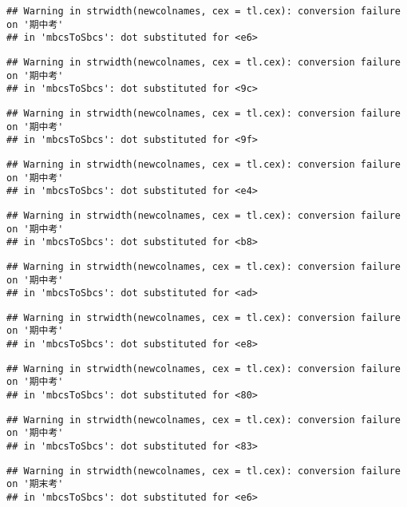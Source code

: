 \documentclass[
]{book}
\begin{document}
\begin{verbatim}
## Warning in strwidth(newcolnames, cex = tl.cex): conversion failure on '期中考'
## in 'mbcsToSbcs': dot substituted for <e6>
\end{verbatim}

\begin{verbatim}
## Warning in strwidth(newcolnames, cex = tl.cex): conversion failure on '期中考'
## in 'mbcsToSbcs': dot substituted for <9c>
\end{verbatim}

\begin{verbatim}
## Warning in strwidth(newcolnames, cex = tl.cex): conversion failure on '期中考'
## in 'mbcsToSbcs': dot substituted for <9f>
\end{verbatim}

\begin{verbatim}
## Warning in strwidth(newcolnames, cex = tl.cex): conversion failure on '期中考'
## in 'mbcsToSbcs': dot substituted for <e4>
\end{verbatim}

\begin{verbatim}
## Warning in strwidth(newcolnames, cex = tl.cex): conversion failure on '期中考'
## in 'mbcsToSbcs': dot substituted for <b8>
\end{verbatim}

\begin{verbatim}
## Warning in strwidth(newcolnames, cex = tl.cex): conversion failure on '期中考'
## in 'mbcsToSbcs': dot substituted for <ad>
\end{verbatim}

\begin{verbatim}
## Warning in strwidth(newcolnames, cex = tl.cex): conversion failure on '期中考'
## in 'mbcsToSbcs': dot substituted for <e8>
\end{verbatim}

\begin{verbatim}
## Warning in strwidth(newcolnames, cex = tl.cex): conversion failure on '期中考'
## in 'mbcsToSbcs': dot substituted for <80>
\end{verbatim}

\begin{verbatim}
## Warning in strwidth(newcolnames, cex = tl.cex): conversion failure on '期中考'
## in 'mbcsToSbcs': dot substituted for <83>
\end{verbatim}

\begin{verbatim}
## Warning in strwidth(newcolnames, cex = tl.cex): conversion failure on '期末考'
## in 'mbcsToSbcs': dot substituted for <e6>
\end{verbatim}
\end{document}
